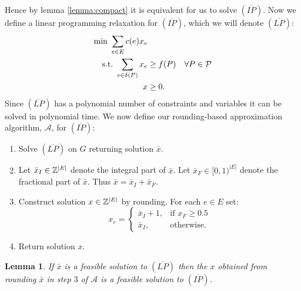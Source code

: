 \documentclass[letterpaper,12pt,oneside,onecolumn]{article}
\newcommand{\cA}{\mathcal{A}} \newcommand{\cB}{\mathcal{B}}
\newtheorem{lemma}[fact]{Lemma}
\begin{document}
\paragraph{}
Hence by lemma \ref{lemma:compact} it is equivalent for us to solve $(\overline{IP})$. Now we define a linear programming relaxation for $(\overline{IP})$, which we will denote $(\overline{LP})$:
\begin{align*}
\min\ \sum_{e\in E} c(e) x_e&\\
\text{s.t.}\  \sum_{e\in\delta(P)} x_e &\geq f(P) &\forall P \in \mathcal{P} \\
x&\geq 0.
\end{align*}
Since $(\overline{LP})$ has a polynomial number of constraints and variables it can be solved in polynomial time. We now define our rounding-based approximation algorithm, $\cA$, for $(\overline{IP})$:
\begin{enumerate}
\item Solve $(\overline{LP})$ on $G$  returning solution $\bar{x}$.
\item Let $\bar{x}_I \in \mathbb{Z}^{|E|}$ denote the integral part of $\bar{x}$. Let $\bar{x}_F \in [0,1)^{|E|}$ denote the fractional part of $\bar{x}$. Thus $\bar{x} = \bar{x}_I + \bar{x}_F.$
\item Construct solution $x \in \mathbb{Z}^{|E|}$ by rounding. For each $e \in E$ set:
$$x_e = \begin{cases}
\bar{x}_I + 1, &\text{if } x_F \geq 0.5 \\
\bar{x}_I, &\text{otherwise.}
\end{cases}$$
\item Return solution $x$.
\end{enumerate}
\begin{lemma}\label{lemma:feasible-rounding}
If $\bar{x}$ is a feasible solution to $(\overline{LP})$ then the $x$ obtained from rounding $\bar{x}$ in step $3$ of $\cA$ is a feasible solution to $(\overline{IP})$.
\end{lemma}
\end{document}

